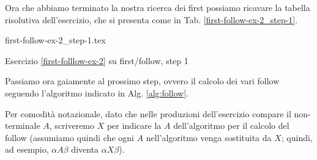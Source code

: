 \documentclass[class=book, crop=false, oneside, 12pt]{standalone}
\begin{document}
Ora che abbiamo terminato la nostra ricerca dei first possiamo ricavare la tabella risolutiva dell'esercizio, che si presenta come in Tab. \ref{first-follow-ex-2_step-1}.
\begin{table}[H]
	\centering
	{first-follow-ex-2_step-1.tex}
    \caption{Esercizio \ref{first-folllow-ex-2} su first/follow, step 1}
    \label{first-follow-ex-2_step-1}
\end{table}
Passiamo ora gaiamente al prossimo step, ovvero il calcolo dei vari follow seguendo l'algoritmo indicato in Alg. \ref{alg:follow}.

Per comodità notazionale, dato che nelle produzioni dell'esercizio compare il non-terminale \(A\), scriveremo \(X\) per indicare la \(A\) dell'algoritmo per il calcolo del follow (assumiamo quindi che ogni \(A\) nell'algoritmo venga sostituita da \(X\); quindi, ad esempio, \(\alpha A \beta\) diventa \(\alpha X \beta\)).
\end{document}
